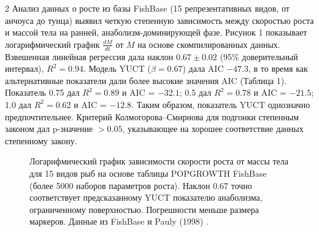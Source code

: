 \documentclass[11pt,a4paper]{article}
\begin{document}
\begin{multicols}{2}
		Анализ данных о росте из базы FishBase (15 репрезентативных видов, от анчоуса до тунца) выявил четкую степенную зависимость между скоростью роста и массой тела на ранней, анаболизм-доминирующей фазе. Рисунок 1 показывает логарифмический график \(\frac{dM}{dt}\) от \(M\) на основе скомпилированных данных. Взвешенная линейная регрессия дала наклон \(0.67 \pm 0.02\) (95\% доверительный интервал), \(R^2 = 0.94\). Модель YUCT (\(\beta = 0.67\)) дала AIC \(-47.3\), в то время как альтернативные показатели дали более высокие значения AIC (Таблица 1). Показатель 0.75 дал \(R^2 = 0.89\) и AIC = \(-32.1\); 0.5 дал \(R^2 = 0.78\) и AIC = \(-21.5\); 1.0 дал \(R^2 = 0.62\) и AIC = \(-12.8\). Таким образом, показатель YUCT однозначно предпочтительнее. Критерий Колмогорова–Смирнова для подгонки степенным законом дал p-значение \(>0.05\), указывающее на хорошее соответствие данных степенному закону.
		
		\begin{figure}[htbp]
			\centering
			\caption{Логарифмический график зависимости скорости роста от массы тела для 15 видов рыб на основе таблицы POPGROWTH FishBase (более 5000 наборов параметров роста). Наклон \(0.67\) точно соответствует предсказанному YUCT показателю анаболизма, ограниченному поверхностью. Погрешности меньше размера маркеров. Данные из FishBase \cite{FishBase} и Pauly (1998) \cite{Pauly1998}.}
			\label{fig:fish}
		\end{figure}
		

\end{multicols}
\end{document}
